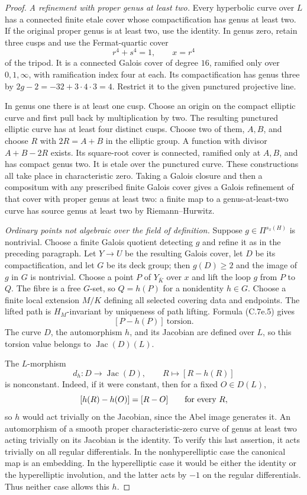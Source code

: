 \begin{proof}
\emph{A refinement with proper genus at least two.}
Every hyperbolic curve over $L$ has a connected finite etale
cover whose compactification has genus at least two.
If the original proper genus is at least two, use the identity.
In genus zero, retain three cusps and use the Fermat-quartic
cover
\[
        r^4+s^4=1,\qquad x=r^4
\]
of the tripod. It is a connected Galois cover of degree $16$,
ramified only over $0,1,\infty$, with ramification index four
at each. Its compactification has genus three by
$2g-2=-32+3\cdot4\cdot3=4$. Restrict it to the given
punctured projective line.

In genus one there is at least one cusp. Choose an origin on
the compact elliptic curve and first pull back by multiplication
by two. The resulting punctured elliptic curve has at least
four distinct cusps. Choose two of them, $A,B$, and choose
$R$ with $2R=A+B$ in the elliptic group. A function with
divisor $A+B-2R$ exists. Its square-root cover is connected,
ramified only at $A,B$, and has compact genus two. It is
etale over the punctured curve. These constructions all take
place in characteristic zero. Taking a Galois closure and then
a compositum with any prescribed finite Galois cover gives a
Galois refinement of that cover with proper genus at least two:
a finite map to a genus-at-least-two curve has source genus
at least two by Riemann--Hurwitz.

\emph{Ordinary points not algebraic over the field of definition.}
Suppose $g\in\Pi^{s_x(H)}$ is nontrivial. Choose a finite
Galois quotient detecting $g$ and refine it as in the preceding
paragraph. Let $Y\to U$ be the resulting Galois cover, let
$D$ be its compactification, and let $G$ be its deck group;
then $g(D)\ge2$ and the image of $g$ in $G$ is nontrivial.
Choose a point $P$ of $Y_{\bar K}$ over $x$ and lift the loop
$g$ from $P$ to $Q$. The fibre is a free $G$-set, so
$Q=h(P)$ for a nonidentity $h\in G$. Choose a finite local
extension $M/K$ defining all selected covering data and endpoints.
The lifted path is $H_M$-invariant by uniqueness of path lifting.
Formula (C.7e.5) gives
\[
                              [P-h(P)]\ \text{torsion}.
\]
The curve $D$, the automorphism $h$, and its Jacobian are defined
over $L$, so this torsion value belongs to $\operatorname{Jac}(D)(L)$.

The $L$-morphism
\[
        d_h:D\longrightarrow\operatorname{Jac}(D),
                    \qquad R\longmapsto[R-h(R)]
\]
is nonconstant. Indeed, if it were constant, then for a fixed
$O\in D(L)$,
\[
     [h(R)-h(O)]=[R-O]\qquad\hbox{for every }R,
\]
so $h$ would act trivially on the Jacobian, since the Abel
image generates it. An automorphism of a smooth proper
characteristic-zero curve of genus at least two acting trivially
on its Jacobian is the identity. To verify this last assertion,
it acts trivially on all regular differentials. In the
nonhyperelliptic case the canonical map is an embedding.
In the hyperelliptic case it would be either the identity or
the hyperelliptic involution, and the latter acts by $-1$ on
the regular differentials. Thus neither case allows this $h$.


\end{proof}
